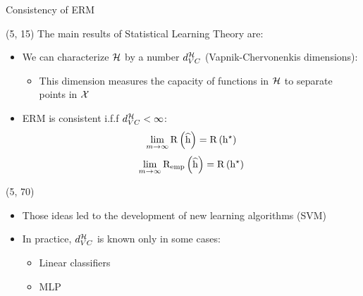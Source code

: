 \begin{frame}{Consistency of \acs{ERM}}

  \begin{textblock}{90}(5, 15)
    The main results of Statistical Learning Theory are:
    \begin{itemize}
    \item<1-> We can characterize $\mathcal{H}$ by a number $d_{VC}^{\mathcal{H}}$
      (Vapnik-Chervonenkis dimensions):
      \begin{itemize}
      \item This dimension measures the capacity of functions in $\mathcal{H}$ to
        separate points in $\mathcal{X}$
      \end{itemize}
    \item<2-> \ac{ERM} is consistent i.f.f $d_{VC}^{\mathcal{H}} < \infty$:
      \[
        \lim\limits_{m \to \infty} \mathrm{R} \left ( {\widehat{\mathrm{h}}} \right ) = \mathrm{R} \left ( {\mathrm{h}^{\star}} \right )
      \]
      \[
        \lim\limits_{m \to \infty} \mathrm{R_{emp}} \left ( {\widehat{\mathrm{h}}} \right ) = \mathrm{R} \left ( {\mathrm{h}^{\star}} \right )
      \]
    \end{itemize}
  \end{textblock}

  \begin{textblock}{90}(5, 70)
    \begin{itemize}
    \item<3-> Those ideas led to the development of new learning algorithms (SVM)
    \item<4-> In practice, $d_{VC}^{\mathcal{H}}$ is known only in some cases:
      \begin{itemize}
      \item Linear classifiers
      \item \ac{MLP}
      \end{itemize}
    \end{itemize}
  \end{textblock}
\end{frame}



